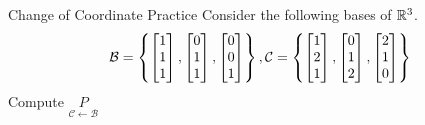 \documentclass[xcoler=dvipsnames, aspectratio=169]{beamer}
\newcommand{\B}{\mathcal{B}}
\newcommand{\C}{\mathcal{C}}
\begin{document}
    \begin{frame}{Change of Coordinate Practice}
        Consider the following bases of $\mathbb{R}^3$.
        \[
            \B = \setBasic{\bMat{1\\1\\1}, \bMat{0\\1\\1}, \bMat{0\\0\\1}},
            \C = \setBasic{\bMat{1\\2\\1}, \bMat{0\\1\\2}, \bMat{2\\1\\0}} 
        \]\pause
        Compute $\underset{\C\leftarrow\B}{P}$
        \iftoggle{showSolutions}{
            \pause
            \[
                \underset{\C\leftarrow\B}{P} = \bMat{
                    0 & \frac{1}{2} & -\frac{1}{2}\\
                    \frac{1}{2} & \frac{1}{4} & \frac{3}{4}\\
                    \frac{1}{2} & -\frac{1}{4}& \frac{1}{4}
                }
            \]
        }{
        }
        \vspace{130pt}
    \end{frame}
\end{document}
